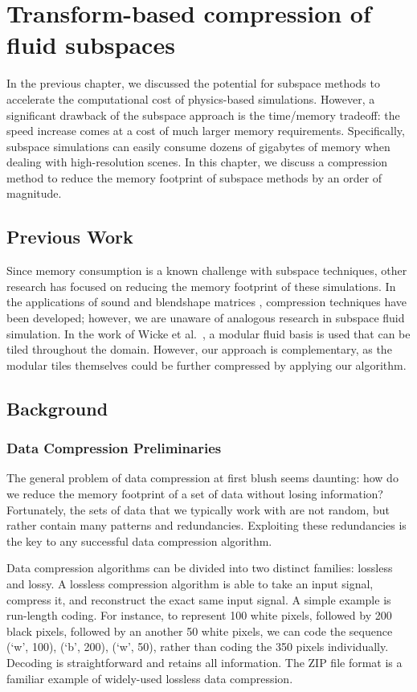 \chapter[Transform-based compression of fluid subspaces]{Transform-based compression of fluid subspaces}

In the previous chapter, we discussed the potential for subspace methods to accelerate the computational cost of physics-based simulations. However, a significant drawback of the subspace approach is the time/memory tradeoff: the speed increase comes at a cost of much larger memory requirements. Specifically, subspace simulations can easily consume dozens of gigabytes of memory when dealing with high-resolution scenes. In this chapter, we discuss a compression method to reduce the memory footprint of subspace methods by an order of magnitude. 

\section{Previous Work}
Since memory consumption is a known challenge with subspace techniques, other research has focused on reducing the memory footprint of these simulations. In the applications of sound \cite{Langlois:2014:ECM} and blendshape matrices \cite{Seo:2011:CDM}, compression techniques have been developed; however, we are unaware of analogous research in subspace fluid simulation. In the work of Wicke et al.~\cite{Wicke:2009}, a modular fluid basis is used that can be tiled throughout the domain. However, our approach is complementary, as the modular tiles themselves could be further compressed by applying our algorithm.

\section{Background}
\subsection{Data Compression Preliminaries}
The general problem of data compression at first blush seems daunting: how do we reduce the memory footprint of a set of data without losing information? Fortunately, the sets of data that we typically work with are not random, but rather contain many patterns and redundancies. Exploiting these redundancies is the key to any successful data compression algorithm.

Data compression algorithms can be divided into two distinct families: lossless and lossy. A lossless compression algorithm is able to take an input signal, compress it, and reconstruct the exact same input signal. A simple example is run-length coding. For instance, to represent 100 white pixels, followed by 200 black pixels, followed by an another 50 white pixels, we can code the sequence (`w', 100), (`b', 200), (`w', 50), rather than coding the 350 pixels individually. Decoding is straightforward and retains all information. The ZIP file format is a familiar example of widely-used lossless data compression.

